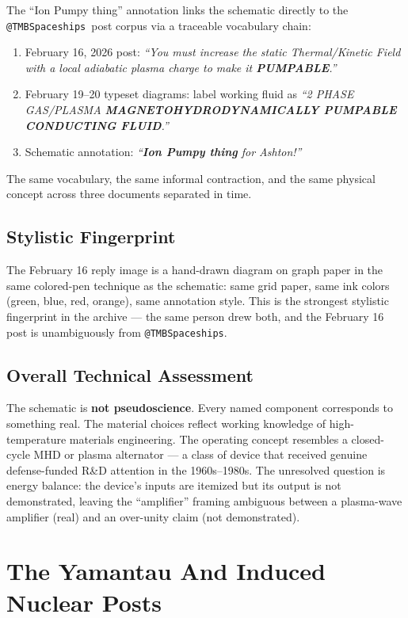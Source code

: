 \documentclass[11pt]{article}
\makeatletter
\newcommand{\account}{\texttt{@TMBSpaceships}}
\makeatother
\begin{document}
The ``Ion Pumpy thing'' annotation links the schematic directly to the \account\ post corpus via a traceable vocabulary chain:

\begin{enumerate}
  \item February 16, 2026 post: \emph{``You must increase the static Thermal/Kinetic Field with a local adiabatic plasma charge to make it \textbf{PUMPABLE}.''}
  \item February 19--20 typeset diagrams: label working fluid as \emph{``2 PHASE GAS/PLASMA \textbf{MAGNETOHYDRODYNAMICALLY PUMPABLE CONDUCTING FLUID}.''}
  \item Schematic annotation: \emph{``\textbf{Ion Pumpy thing} for Ashton!''}
\end{enumerate}

The same vocabulary, the same informal contraction, and the same physical concept across three documents separated in time.

\subsection{Stylistic Fingerprint}

The February 16 reply image is a hand-drawn diagram on graph paper in the same colored-pen technique as the schematic: same grid paper, same ink colors (green, blue, red, orange), same annotation style. This is the strongest stylistic fingerprint in the archive — the same person drew both, and the February 16 post is unambiguously from \account.

\subsection{Overall Technical Assessment}

The schematic is \textbf{not pseudoscience}. Every named component corresponds to something real. The material choices reflect working knowledge of high-temperature materials engineering. The operating concept resembles a closed-cycle MHD or plasma alternator — a class of device that received genuine defense-funded R\&D attention in the 1960s--1980s. The unresolved question is energy balance: the device's inputs are itemized but its output is not demonstrated, leaving the ``amplifier'' framing ambiguous between a plasma-wave amplifier (real) and an over-unity claim (not demonstrated).

\section{The Yamantau And Induced Nuclear Posts}
\end{document}
